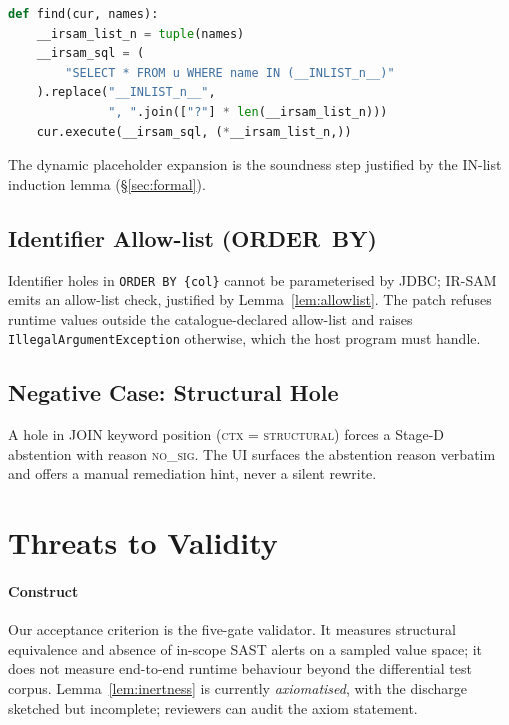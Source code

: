 \documentclass[conference]{IEEEtran}
\newcommand{\IRSAM}{\textsc{IR-SAM}}
\begin{document}
\begin{lstlisting}[style=code,language=Python,
  caption={Python DB-API IN-list -- \IRSAM{} rewrite.},
  label={lst:py-good}]
def find(cur, names):
    __irsam_list_n = tuple(names)
    __irsam_sql = (
        "SELECT * FROM u WHERE name IN (__INLIST_n__)"
    ).replace("__INLIST_n__",
              ", ".join(["?"] * len(__irsam_list_n)))
    cur.execute(__irsam_sql, (*__irsam_list_n,))
\end{lstlisting}

The dynamic placeholder expansion is the soundness step justified by
the IN-list induction lemma (\S\ref{sec:formal}).

\subsection{Identifier Allow-list (ORDER~BY)}
Identifier holes in \texttt{ORDER BY \{col\}} cannot be
parameterised by JDBC; \IRSAM{} emits an allow-list check, justified
by Lemma~\ref{lem:allowlist}. The patch refuses runtime values
outside the catalogue-declared allow-list and raises
\texttt{IllegalArgumentException} otherwise, which the host program
must handle.

\subsection{Negative Case: Structural Hole}
A hole in JOIN keyword position (\textsc{ctx} = \textsc{structural})
forces a Stage-D abstention with reason \textsc{no\_sig}. The UI
surfaces the abstention reason verbatim and offers a manual
remediation hint, never a silent rewrite.

\section{Threats to Validity}\label{sec:threats}

\paragraph*{Construct}
Our acceptance criterion is the five-gate validator.  It measures
structural equivalence and absence of in-scope SAST alerts on a
sampled value space; it does not measure end-to-end runtime
behaviour beyond the differential test corpus.  Lemma~\ref{lem:inertness}
is currently \emph{axiomatised}, with the discharge sketched but
incomplete; reviewers can audit the axiom statement.
\end{document}
